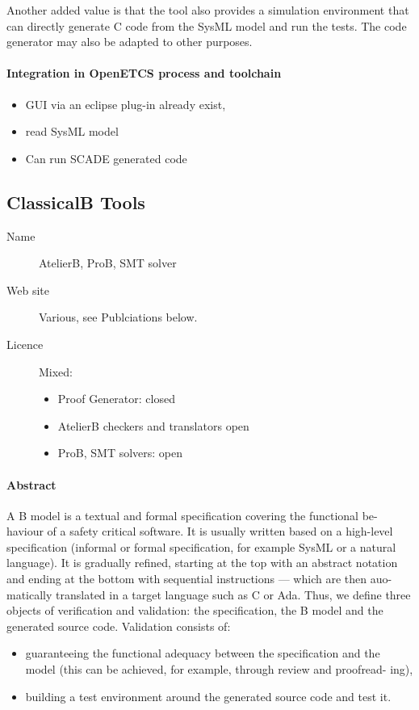 Another added value is that the tool also provides a simulation
environment that can directly generate C code from the SysML model and
run the tests.
The code generator may also be adapted to other purposes.

\paragraph{Integration in OpenETCS process and toolchain}

\begin{itemize}
  \item GUI via an eclipse plug-in already exist,
  \item read SysML model
  \item Can run SCADE generated code
\end{itemize}

\subsection{ClassicalB Tools}
\label{sec:ClassicalB}

\begin{description}
\item[Name] AtelierB, ProB, SMT solver
\item[Web site] Various, see Publciations below.
\item[Licence] Mixed:
  \begin{itemize}
    \item Proof Generator:  closed
    \item AtelierB checkers and translators open
    \item ProB, SMT solvers: open
  \end{itemize}
\end{description}

\paragraph{Abstract}

A B model is a textual and formal specification covering the functional be-
haviour of a safety critical software. It is usually written based on a high-level
specification (informal or formal specification, for example SysML or a natural
language). It is gradually refined, starting at the top with an abstract notation
and ending at the bottom with sequential instructions — which are then auo-
matically translated in a target language such as C or Ada.
Thus, we define three objects of verification and validation: the specification,
the B model and the generated source code.
Validation consists of:
\begin{itemize}

\item guaranteeing the functional adequacy between the specification and the
model (this can be achieved, for example, through review and proofread-
ing),
\item building a test environment around the generated source code and test it.

\end{itemize}

